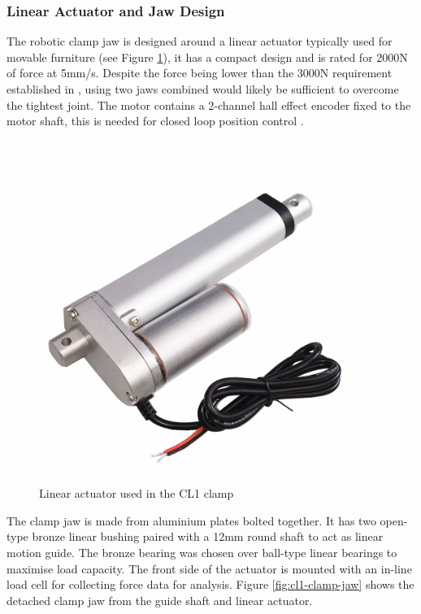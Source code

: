 \subsubsection{Linear Actuator and Jaw Design}
\label{subsubsection:exploration-1-linear-actuator-and-jaw-design}

The robotic clamp jaw is designed around a linear actuator typically used for movable furniture (see Figure \ref{fig:linear-actuator-cl1}), it has a compact design and is rated for 2000N of force at 5mm/s. Despite the force being lower than the 3000N requirement established in , using two jaws combined would likely be sufficient to overcome the tightest joint. The motor contains a 2-channel hall effect encoder fixed to the motor shaft, this is needed for closed loop position control .

\begin{figure}[hb!]
    \centering
    \includegraphics[width=0.99\textwidth]{images/04-3/cl1-linearactuator.jpg}
    \caption{Linear actuator used in the CL1 clamp}
    \label{fig:linear-actuator-cl1}
\end{figure}

The clamp jaw is made from aluminium plates bolted together. It has two open-type bronze linear bushing paired with a 12mm round shaft to act as linear motion guide. The bronze bearing was chosen over ball-type linear bearings to maximise load capacity. The front side of the actuator is mounted with an in-line load cell for collecting force data for analysis. Figure \ref{fig:cl1-clamp-jaw} shows the detached clamp jaw from the guide shaft and linear actuator.

